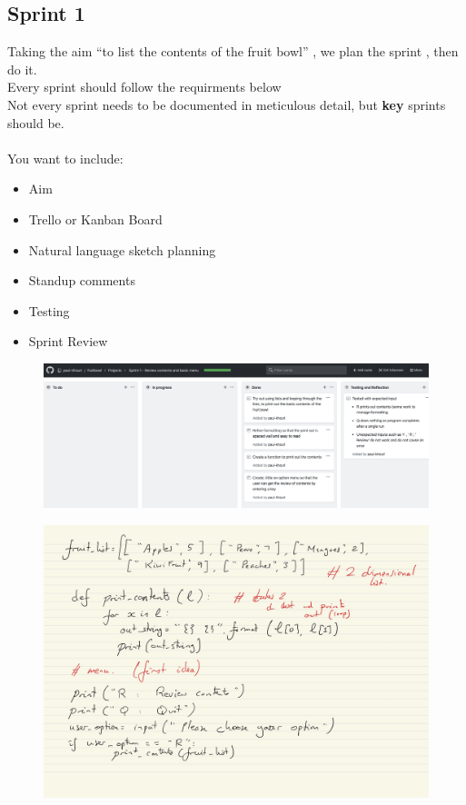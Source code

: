 \documentclass[a4paper,12pt]{article}
\begin{document}
\subsection{Sprint 1}
Taking the aim ``to list the contents of the fruit bowl'' , we plan the sprint , then do it.\\
Every sprint should follow the requirments below\\
Not every sprint needs to be documented in meticulous detail, but \textbf{key} sprints should be.\\\\
You want to include:
\begin{itemize}
	\item Aim
	\item Trello or Kanban Board
	\item  Natural language sketch planning
	\item Standup comments
	\item  Testing
	\item Sprint Review
\end{itemize}
\begin{figure}[!ht]
	\centering
	\includegraphics[width=16cm]{images/board_1.png}
\end{figure}
\begin{figure}[!ht]
	\centering
	\includegraphics[width=14cm]{images/Sprint_1_plan.jpg}
\end{figure}
\newpage

\end{document}
